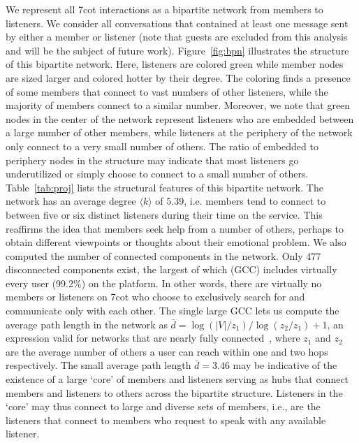 We represent all 7cot interactions as a bipartite network from members to listeners.
We consider all conversations that contained 
at least one message sent by either a member or listener (note that guests are excluded
from this analysis and will be the subject of future work). Figure~\ref{fig:bpn}
illustrates the structure of this bipartite network. Here, listeners are colored green while
member nodes are sized larger and colored hotter by their degree. The coloring finds a 
presence of some members that connect to vast numbers of other listeners, while the majority
of members connect to a similar number. Moreover, we note that green nodes in the 
center of the network represent listeners who are embedded between a large number of other
members, while listeners at the periphery of the network only connect to a very small number
of others. The ratio of embedded to periphery nodes in the structure may indicate that most
listeners go underutilized or simply choose to connect to a small number of others. 
Table~\ref{tab:proj} lists the structural features of this bipartite 
network. The network has an average degree $\langle k \rangle$ of $5.39$, 
i.e. members tend to connect to between five or six distinct listeners
during their time on the service. 
This reaffirms the idea that members seek help from a number of others, perhaps
to obtain different viewpoints or thoughts about their emotional problem. 
We also computed
the number of connected components in the network. Only 477 disconnected components exist,
the largest of which (GCC) includes virtually every user (99.2\%) on the platform.
In other words, there are virtually no members or listeners on 7cot who choose to 
exclusively search for and communicate only with each other. 
The single large GCC lets us compute the average path length in the network as
$\bar{d} = \log(|V|/z_1)/\log(z_2/z_1) + 1$, an expression valid for 
networks that are nearly fully connected~\cite{newman2010networks}, 
where $z_1$ and $z_2$ are the average number of others a user can reach within
one and two hops respectively. The small average path length $\bar{d} = 3.46$
may be indicative of the existence of a large `core' of members and 
listeners serving as hubs that connect members and listeners to others across
the bipartite structure. 
Listeners in the `core' may thus connect to large and diverse sets of members, i.e., 
are the listeners that connect to members who request to speak with 
any available listener. 

